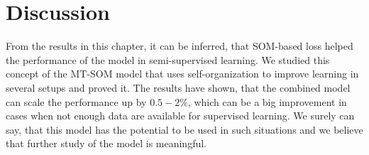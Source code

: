 
\section{Discussion}
From the results in this chapter, it can be inferred, that SOM-based loss helped the performance of the model in semi-supervised learning. We studied this concept of the MT-SOM model that uses self-organization to improve learning in several setups and proved it. The results have shown, that the combined model can scale the performance up by $0.5-2\%$, which can be a big improvement in cases when not enough data are available for supervised learning. We surely can say, that this model has the potential to be used in such situations and we believe that further study of the model is meaningful.